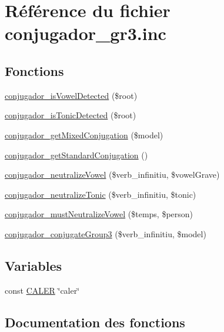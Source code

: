 \hypertarget{conjugador__gr3_8inc}{}\section{Référence du fichier conjugador\+\_\+gr3.\+inc}
\label{conjugador__gr3_8inc}
\subsection*{Fonctions}
\begin{DoxyCompactItemize}
\item 
\hyperlink{conjugador__gr3_8inc_a688122e728649856c4dede0a1c1fabb5}{conjugador\+\_\+is\+Vowel\+Detected} (\$root)
\item 
\hyperlink{conjugador__gr3_8inc_a3920febe59bd11cb42cd71eb1ecc1877}{conjugador\+\_\+is\+Tonic\+Detected} (\$root)
\item 
\hyperlink{conjugador__gr3_8inc_a63f5a06816fc5ba96efef90d519a22c4}{conjugador\+\_\+get\+Mixed\+Conjugation} (\$model)
\item 
\hyperlink{conjugador__gr3_8inc_ae0396ebccfe3276e0babfb92c143ddcd}{conjugador\+\_\+get\+Standard\+Conjugation} ()
\item 
\hyperlink{conjugador__gr3_8inc_ab7dc6b4f2a809a04cbe98e6885a895dc}{conjugador\+\_\+neutralize\+Vowel} (\$verb\+\_\+infinitiu, \$vowel\+Grave)
\item 
\hyperlink{conjugador__gr3_8inc_a947ef6897639f09bfec229c106a1baa3}{conjugador\+\_\+neutralize\+Tonic} (\$verb\+\_\+infinitiu, \$tonic)
\item 
\hyperlink{conjugador__gr3_8inc_a1cfc9cf5cbbb005b55985d39ed2201c4}{conjugador\+\_\+must\+Neutralize\+Vowel} (\$temps, \$person)
\item 
\hyperlink{conjugador__gr3_8inc_ae22fa28537be9bd6c1e05a97931bcc6d}{conjugador\+\_\+conjugate\+Group3} (\$verb\+\_\+infinitiu, \$model)
\end{DoxyCompactItemize}
\subsection*{Variables}
\begin{DoxyCompactItemize}
\item 
const \hyperlink{conjugador__gr3_8inc_afb7f357610ed4add7b75ee405fc8c69c}{C\+A\+L\+ER} \char`\"{}caler\char`\"{}
\end{DoxyCompactItemize}


\subsection{Documentation des fonctions}
\hypertarget{conjugador__gr3_8inc_ae22fa28537be9bd6c1e05a97931bcc6d}{}\label{conjugador__gr3_8inc_ae22fa28537be9bd6c1e05a97931bcc6d} 
